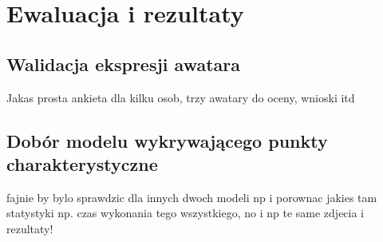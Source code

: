 \chapter{Ewaluacja i rezultaty}
\label{cha:ewaluacjaIRezultaty}
\section{Walidacja ekspresji awatara}
Jakas prosta ankieta dla kilku osob, trzy awatary do oceny, wnioski itd
\section{Dobór modelu wykrywającego punkty charakterystyczne}
fajnie by bylo sprawdzic dla innych dwoch modeli np i porownac jakies tam statystyki np. czas wykonania tego wszystkiego, no i np te same zdjecia i rezultaty!